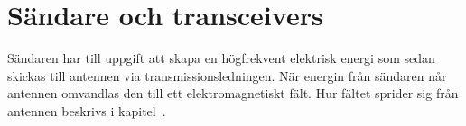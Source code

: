\chapter[Sändare]{Sändare och transceivers}
\label{ch:saendare}
\label{ch:transceiver}

Sändaren har till uppgift att skapa en högfrekvent elektrisk energi som sedan
skickas till antennen via transmissionsledningen.
När energin från sändaren når antennen omvandlas den till ett elektromagnetiskt
fält.
Hur fältet sprider sig från antennen beskrivs i
kapitel~.
